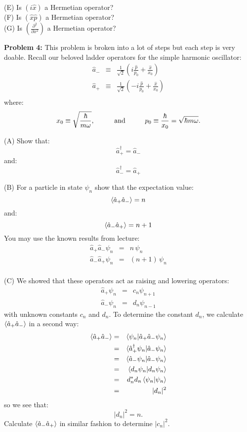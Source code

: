 \documentclass[12pt]{article}
\begin{document}
\noindent
(E) Is $\left(i\hat{x}\right)$ a Hermetian operator?\\[5pt]

\noindent
(F) Is $\left(\hat{x}\hat{p}\right)$ a Hermetian operator?\\[5pt]

\noindent
(G) Is $\left(\frac{\partial^2}{\partial x^2}\right)$ a Hermetian operator?\\[5pt]

\newpage

\noindent
{\bf Problem 4:}  This problem is broken into a lot of steps but each step is very doable.  Recall our beloved ladder operators for the simple harmonic oscillator:
\begin{eqnarray*}
\hat{a}_- &\equiv& \frac{1}{\sqrt{2}}\left(i \frac{\hat{p}}{p_0} + \frac{\hat{x}}{x_0}\right) \\
\hat{a}_+ &\equiv& \frac{1}{\sqrt{2}}\left(-i \frac{\hat{p}}{p_0} + \frac{\hat{x}}{x_0} \right) \\
\end{eqnarray*}
where:
$$x_0 \equiv \sqrt{\frac{\hbar}{m \omega}}, \hspace{1cm} {\rm and} \hspace{1cm} p_0 \equiv \frac{\hbar}{x_0} = \sqrt{\hbar m \omega}.$$

\noindent
(A) Show that:
$$\hat{a}_+^\dagger = \hat{a}_-$$
and:
$$\hat{a}_-^\dagger = \hat{a}_+$$

\noindent
(B) For a particle in state $\psi_n$ show that the expectation value:
$$\braket{\hat{a}_+\hat{a}_-} = n $$
and:
$$\braket{\hat{a}_-\hat{a}_+} = n+1$$
You may use the known results from lecture:
\begin{eqnarray*}
\hat{a}_+\hat{a}_- \psi_n &=& n \, \psi_{n} \\
\hat{a}_-\hat{a}_+ \psi_n &=& (n+1) \, \psi_{n} \\
\end{eqnarray*}

\noindent
(C) We showed that these operators act as raising and lowering operators:
\begin{eqnarray*}
\hat{a}_+ \psi_n &=& c_n \psi_{n+1} \\
\hat{a}_- \psi_n &=& d_n \psi_{n-1} 
\end{eqnarray*}
with unknown constants $c_n$ and $d_n$.  To determine the constant $d_n$, we calculate $\braket{\hat{a}_+\hat{a}_-}$ in a second way:
\begin{eqnarray*}
\braket{\hat{a}_+\hat{a}_-} &=& \braket{\psi_n | \hat{a}_+ \hat{a}_- \psi_n}\\
 &=& \braket{\hat{a}_+^\dagger \psi_n | \hat{a}_- \psi_n}\\
 &=& \braket{\hat{a}_- \psi_n | \hat{a}_- \psi_n}\\
 &=& \braket{d_n \psi_n | d_n \psi_n}\\
 &=& d_n^* d_n \braket{\psi_n | \psi_n}\\
 &=& |d_n|^2\\ 
\end{eqnarray*}
so we see that:
$$|d_n|^2 = n.$$
Calculate $\braket{\hat{a}_-\hat{a}_+}$ in similar fashion to determine $|c_n|^2$.\\[5pt]
\end{document}
